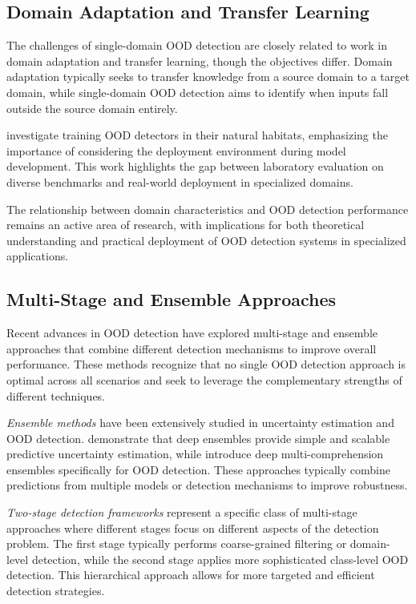\documentclass[11pt, oneside]{book}
\theoremstyle{plain}
\theoremstyle{definition}
\theoremstyle{remark}
\begin{document}
\subsection{Domain Adaptation and Transfer Learning}

The challenges of single-domain OOD detection are closely related to work in domain adaptation and transfer learning, though the objectives differ. Domain adaptation typically seeks to transfer knowledge from a source domain to a target domain, while single-domain OOD detection aims to identify when inputs fall outside the source domain entirely.

\citet{katz2022training} investigate training OOD detectors in their natural habitats, emphasizing the importance of considering the deployment environment during model development. This work highlights the gap between laboratory evaluation on diverse benchmarks and real-world deployment in specialized domains.

The relationship between domain characteristics and OOD detection performance remains an active area of research, with implications for both theoretical understanding and practical deployment of OOD detection systems in specialized applications.

\subsection{Multi-Stage and Ensemble Approaches}

Recent advances in OOD detection have explored multi-stage and ensemble approaches that combine different detection mechanisms to improve overall performance. These methods recognize that no single OOD detection approach is optimal across all scenarios and seek to leverage the complementary strengths of different techniques.

\emph{Ensemble methods} have been extensively studied in uncertainty estimation and OOD detection. \citet{lakshminarayanan2017simple} demonstrate that deep ensembles provide simple and scalable predictive uncertainty estimation, while \citet{pmlr-v235-xu24ae} introduce deep multi-comprehension ensembles specifically for OOD detection. These approaches typically combine predictions from multiple models or detection mechanisms to improve robustness.

\emph{Two-stage detection frameworks} represent a specific class of multi-stage approaches where different stages focus on different aspects of the detection problem. The first stage typically performs coarse-grained filtering or domain-level detection, while the second stage applies more sophisticated class-level OOD detection. This hierarchical approach allows for more targeted and efficient detection strategies.
\end{document}
